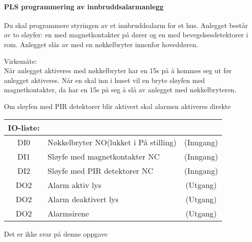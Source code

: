 



\paragraph{PLS programmering av innbruddsalarmanlegg}

\vskip 10pt
Du skal programmere styringen av et innbruddsalarm for et hus. Anlegget består av to sløyfer: en med magnetkontakter på dører og en med bevegelsesdetektorer i rom. Anlegget slås av med en nøkkelbryter innenfor hoveddøren. 

\vskip 10pt
Virkemåte:\\

Når anlegget aktiveres med nøkkelbryter har en 15s på å kommes seg ut før anlegget aktiveres. Når en skal inn i huset vil en bryte sløyfen med magnetkontakter, da har en 15s på seg å slå av anlegget med nøkkelbryteren. 

\vskip 10pt
Om sløyfen med PIR detektorer blir aktivert skal alarmen aktiveres direkte 

\vskip 10pt
\begin{tabular}{|c|l|c|}
\hline 
	IO-liste: & &  \tabularnewline 
\hline 
	DI0 &	 Nøkkelbryter NO(lukket i På stilling) 	 &(Inngang)\tabularnewline

\hline 
	DI1 &	 Sløyfe med magnetkontakter NC		 &(Inngang)\tabularnewline

\hline 
	DI2 &	 Sløyfe med PIR detektorer NC		 &(Inngang)\tabularnewline

\hline 
	DO2 &	 Alarm aktiv lys			 &(Utgang)\tabularnewline

\hline 
	DO2 &	 Alarm deaktivert lys			 &(Utgang)\tabularnewline

\hline 
	DO2 &	 Alarmsirene				 &(Utgang)\tabularnewline

\hline 


\end{tabular}

\vskip 10pt





Det er ikke svar på denne oppgave












